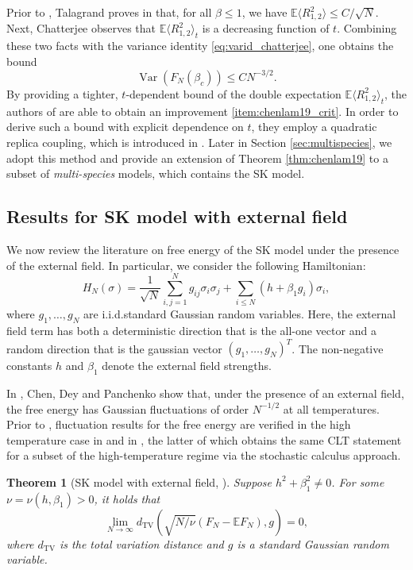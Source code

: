 \documentclass[11pt]{article}
\numberwithin{equation}{section}
\DeclareMathOperator{\Var}{Var}
\newcommand{\ip}[1]{\langle {#1} \rangle }
\def \b {\beta}
\def \s {\sigma}
\newcommand{\bE}{\mathbb{E}}
\newtheorem{theorem}{Theorem}[section]
\theoremstyle{remark}
\begin{document}
Prior to \cite{ChenLam19}, Talagrand proves in \cite[Section 11.7]{Talagrandvol2} that, for all $\b \leq 1$, we have $\bE \ip{R_{1,2}^2} \leq C/\sqrt{N}$. Next, Chatterjee observes that $\bE \ip{R_{1,2}^2}_{t}$ is a decreasing function of $t$. Combining these two facts with the variance identity \eqref{eq:varid_chatterjee}, one obtains the bound
\[
\Var(F_N(\b_c)) \leq CN^{-3/2}.
\]
By providing a tighter, $t$-dependent bound of the double expectation $\bE \ip{R_{1,2}^2}_{t}$, the authors of \cite{ChenLam19} are able to obtain an improvement \eqref{item:chenlam19_crit}. In order to derive such a bound with explicit dependence on $t$, they employ a quadratic replica coupling, which is introduced in \cite{GuerraToninelli_2002a}. Later in Section \ref{sec:multispecies}, we adopt this method and provide an extension of Theorem \ref{thm:chenlam19} to a subset of \emph{multi-species} models, which contains the SK model.

\subsection{Results for SK model with external field}\label{sec:SK+ext}

We now review the literature on free energy of the SK model under the presence of the external field. In particular, we consider the following Hamiltonian: 
\[
H_N(\s) = \frac1{\sqrt N}\sum_{i,j=1}^N g_{ij}\s_i\s_j  + \sum_{i\leq N} (h+\b_1 g_i)\s_i,
\]
where $g_1, \dots, g_N$ are i.i.d.\@ standard Gaussian random variables. Here, the external field term has both a deterministic direction that is the all-one vector and a random direction that is the gaussian vector $(g_1, \dots, g_N)^T$. The non-negative constants $h$ and $\b_1$ denote the external field strengths. 

In \cite{ChenDeyPanchenko}, Chen, Dey and Panchenko show that, under the presence of an external field, the free energy has Gaussian fluctuations of order $N^{-1/2}$ at all temperatures. Prior to \cite{ChenDeyPanchenko}, fluctuation results for the free energy are verified in the high temperature case in \cite[Theorem 5]{GuerraToninelli_2002b} and in \cite{Tindel_2005}, the latter of which obtains the same CLT statement for a subset of the high-temperature regime via the stochastic calculus approach. 

\begin{theorem}[SK model with external field, ]\label{thm:chendeypanchenko}
    Suppose $h^2+\b_1^2 \neq 0$. For some $\nu = \nu(h,
    \b_1)>0$, it holds that 
    \[
    \lim_{N\to \infty} d_{\mathrm{TV}}\left(\sqrt{N/\nu}(F_N-\bE F_N), g\right) = 0,
    \]
    where $d_{\mathrm{TV}}$ is the total variation distance and $g$ is a standard Gaussian random variable. 
\end{theorem}
\end{document}
